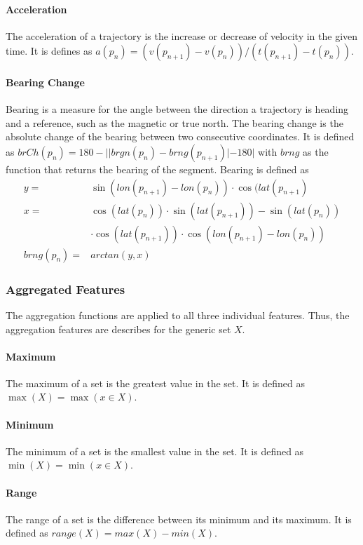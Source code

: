 \paragraph{Acceleration} The acceleration of a trajectory is the increase or decrease of velocity in the given time. It is defines as $ a(p_n) = (v(p_{n+1}) - v(p_n))/(t(p_{n+1}) - t(p_n))$. \cite{Zheng2008}

\paragraph{Bearing Change} Bearing is a measure for the angle between the direction a trajectory is heading and a reference, such as the magnetic or true north. The bearing change is the absolute change of the bearing between two consecutive coordinates. It is defined as $ brCh(p_n) = 180 - | |brgn(p_n) - brng(p_{n+1})
| - 180| $ with $brng$ as the function that returns the bearing of the segment. \cite{Dabiri2018} Bearing is defined as
\begin{align*}
            y =& \sin (lon(p_{n+1})-lon(p_n)) \cdot \cos(lat(p_{n+1}) \\ 
            x =& \cos (lat(p_n)) \cdot \sin (lat(p_{n+1}))-\sin (lat(p_n))\\
               & \cdot \cos (lat(p_{n+1})) \cdot \cos(lon(p_{n+1})-lon(p_n)) \\
    brng(p_n) =& arctan(y,x)
\end{align*}

\subsubsection{Aggregated Features}
The aggregation functions are applied to all three individual features. Thus, the aggregation features are describes for the generic set $X$.

\paragraph{Maximum} The maximum of a set is the greatest value in the set. It is defined as $ \max (X) = \max(x \in X)$.

\paragraph{Minimum} The minimum of a set is the smallest value in the set. It is defined as $ \min (X) = \min (x \in X) $.

\paragraph{Range} The range of a set is the difference between its minimum and its maximum. It is defined as $ range(X) = max(X) - min(X)$.  

